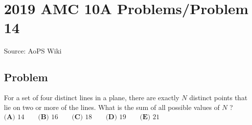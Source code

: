 \documentclass[12pt]{article}
\begin{document}
\section*{{2019 AMC 10A Problems/Problem 14}}
Source: AoPS Wiki

\subsection*{Problem}
For a set of four distinct lines in a plane, there are exactly $N$ distinct points that lie on two or more of the lines. What is the sum of all possible values of $N$ ? $\textbf{(A) } 14 \qquad \textbf{(B) } 16 \qquad \textbf{(C) } 18 \qquad \textbf{(D) } 19 \qquad \textbf{(E) } 21$
\end{document}
